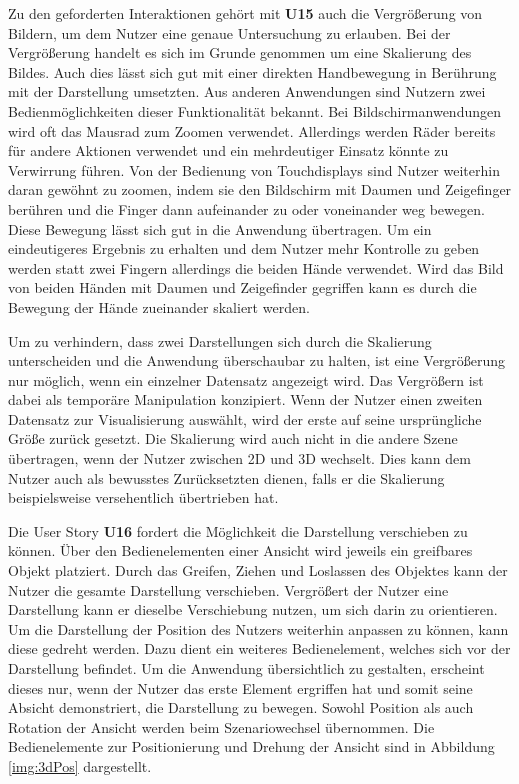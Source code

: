 Zu den geforderten Interaktionen gehört mit \textbf{U15} auch die Vergrößerung von Bildern, um dem Nutzer eine genaue Untersuchung zu erlauben. Bei der Vergrößerung handelt es sich im Grunde genommen um eine Skalierung des Bildes. Auch dies lässt sich gut mit einer direkten Handbewegung in Berührung mit der Darstellung umsetzten. Aus anderen Anwendungen sind Nutzern zwei Bedienmöglichkeiten dieser Funktionalität bekannt. Bei Bildschirmanwendungen wird oft das Mausrad zum Zoomen verwendet. Allerdings werden Räder bereits für andere Aktionen verwendet und ein mehrdeutiger Einsatz könnte zu Verwirrung führen. Von der Bedienung von Touchdisplays sind Nutzer weiterhin daran gewöhnt zu zoomen, indem sie den Bildschirm mit Daumen und Zeigefinger berühren und die Finger dann aufeinander zu oder voneinander weg bewegen. Diese Bewegung lässt sich gut in die Anwendung übertragen. Um ein eindeutigeres Ergebnis zu erhalten und dem Nutzer mehr Kontrolle zu geben werden statt zwei Fingern allerdings die beiden Hände verwendet. Wird das Bild von beiden Händen mit Daumen und Zeigefinder gegriffen kann es durch die Bewegung der Hände zueinander skaliert werden.

Um zu verhindern, dass zwei Darstellungen sich durch die Skalierung unterscheiden und die Anwendung überschaubar zu halten, ist eine Vergrößerung nur möglich, wenn ein einzelner Datensatz angezeigt wird. 
Das Vergrößern ist dabei als temporäre Manipulation konzipiert. Wenn der Nutzer einen zweiten Datensatz zur Visualisierung auswählt, wird der erste auf seine ursprüngliche Größe zurück gesetzt. Die Skalierung wird auch nicht in die andere Szene übertragen, wenn der Nutzer zwischen 2D und 3D wechselt. Dies kann dem Nutzer auch als bewusstes Zurücksetzten dienen, falls er die Skalierung beispielsweise versehentlich übertrieben hat.

Die User Story \textbf{U16} fordert die Möglichkeit die Darstellung verschieben zu können. %
Über den Bedienelementen einer Ansicht wird jeweils ein greifbares Objekt platziert. Durch das Greifen, Ziehen und Loslassen des Objektes kann der Nutzer die gesamte Darstellung verschieben. %
Vergrößert der Nutzer eine Darstellung kann er dieselbe Verschiebung nutzen, um sich darin zu orientieren. 
Um die Darstellung der Position des Nutzers weiterhin anpassen zu können, kann diese gedreht werden. Dazu dient ein weiteres Bedienelement, welches sich vor der Darstellung befindet. Um die Anwendung übersichtlich zu gestalten, erscheint dieses nur, wenn der Nutzer das erste Element ergriffen hat und somit seine Absicht demonstriert, die Darstellung zu bewegen. 
Sowohl Position als auch Rotation der Ansicht werden beim Szenariowechsel übernommen.
Die Bedienelemente zur Positionierung und Drehung der Ansicht sind in Abbildung \ref{img:3dPos} dargestellt. 

